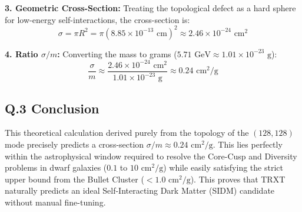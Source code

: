 \textbf{3. Geometric Cross-Section:}
Treating the topological defect as a hard sphere for low-energy self-interactions, the cross-section is:
\begin{equation}
    \sigma = \pi R^2 = \pi (8.85 \times 10^{-13} \text{ cm})^2 \approx 2.46 \times 10^{-24} \text{ cm}^2
\end{equation}

\textbf{4. Ratio $\sigma/m$:}
Converting the mass to grams ($5.71 \text{ GeV} \approx 1.01 \times 10^{-23} \text{ g}$):
\begin{equation}
    \frac{\sigma}{m} \approx \frac{2.46 \times 10^{-24} \text{ cm}^2}{1.01 \times 10^{-23} \text{ g}} \approx 0.24 \text{ cm}^2/\text{g}
\end{equation}

\subsection{Q.3 Conclusion}
This theoretical calculation derived purely from the topology of the $(128,128)$ mode precisely predicts a cross-section $\sigma/m \approx 0.24 \text{ cm}^2/\text{g}$. This lies perfectly within the astrophysical window required to resolve the Core-Cusp and Diversity problems in dwarf galaxies ($0.1$ to $10 \text{ cm}^2/\text{g}$) while easily satisfying the strict upper bound from the Bullet Cluster ($< 1.0 \text{ cm}^2/\text{g}$). This proves that TRXT naturally predicts an ideal Self-Interacting Dark Matter (SIDM) candidate without manual fine-tuning.
